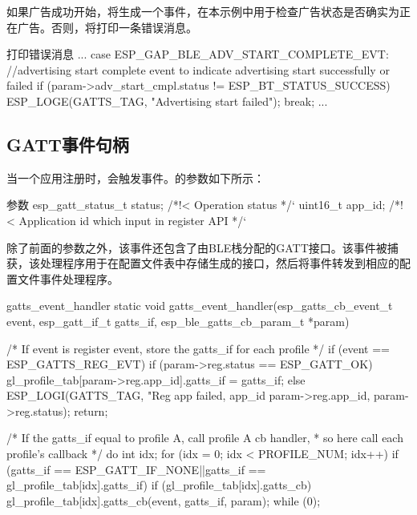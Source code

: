 \documentclass[lang=cn,newtx,10pt,scheme=chinese]{elegantbook}
\begin{document}
如果广告成功开始，将生成一个事件，在本示例中用于检查广告状态是否确实为正在广告。否则，将打印一条错误消息。

\begin{mycode}{打印错误消息}
...
    case ESP_GAP_BLE_ADV_START_COMPLETE_EVT:
    //advertising start complete event to indicate advertising start successfully or failed
         if (param->adv_start_cmpl.status != ESP_BT_STATUS_SUCCESS) {
             ESP_LOGE(GATTS_TAG, "Advertising start failed\n");
         }
         break;
...
\end{mycode}

\subsection{GATT事件句柄}

当一个应用注册时，会触发事件。的参数如下所示：

\begin{mycode}{参数}
esp_gatt_status_t status;  /*!< Operation status */`
uint16_t app_id;           /*!< Application id which input in register API */`
\end{mycode}

除了前面的参数之外，该事件还包含了由BLE栈分配的GATT接口。该事件被捕获，该处理程序用于在配置文件表中存储生成的接口，然后将事件转发到相应的配置文件事件处理程序。

\begin{mycode}{gatts\_event\_handler}
static void gatts_event_handler(esp_gatts_cb_event_t event, esp_gatt_if_t gatts_if, esp_ble_gatts_cb_param_t *param)
{
    /* If event is register event, store the gatts_if for each profile */
    if (event == ESP_GATTS_REG_EVT) {
        if (param->reg.status == ESP_GATT_OK) {
            gl_profile_tab[param->reg.app_id].gatts_if = gatts_if;
        } else {
            ESP_LOGI(GATTS_TAG, "Reg app failed, app_id %
                    param->reg.app_id,
                    param->reg.status);
            return;
        }
    }

/* If the gatts_if equal to profile A, call profile A cb handler,
 * so here call each profile's callback */
    do {
        int idx;
        for (idx = 0; idx < PROFILE_NUM; idx++) {
            if (gatts_if == ESP_GATT_IF_NONE||gatts_if == gl_profile_tab[idx].gatts_if) {
                if (gl_profile_tab[idx].gatts_cb) {
                    gl_profile_tab[idx].gatts_cb(event, gatts_if, param);
                }
            }
        }
    } while (0);
}
\end{mycode}
\end{document}
